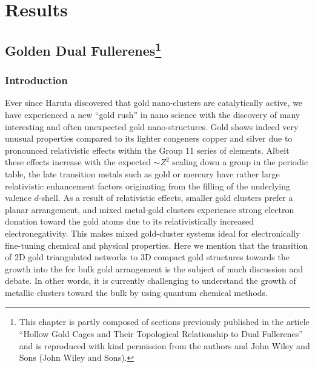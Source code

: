 
\part{Results}
\label{sec:results}

\chapter[Golden Dual Fullerenes]{
    Golden Dual Fullerenes\footnote{This chapter is partly composed of sections
    previously published in the article ``Hollow Gold Cages and Their
    Topological Relationship to Dual
    Fullerenes''\autocite{Trombach_HollowGoldCages_2016a} and is reproduced
    with kind permission from the authors and John Wiley and Sons
    (\textcopyright John Wiley and Sons).}
}
\label{sec:goldendualfullerenes}

\section{\label{sec:intro}Introduction}

Ever since Haruta discovered that gold nano-clusters are catalytically active,\autocite{Haruta1987,Haruta2003,Haruta2007,Haruta2007a}
we have experienced a new ``gold rush'' in nano science\autocite{Schwerdtfeger_Goldgoesnano_2003,Hakkinen2008,Maity2012,Zhang2012a,Gong2012,Miao2012,Kyoungweon-2013}
with the discovery of many interesting and often unexpected gold nano-structures.\autocite{Chen-2015}
Gold shows indeed very unusual properties compared to its lighter congeners copper and silver
due to pronounced relativistic effects within the Group 11 series of elements.\autocite{Pyykko-1988,Schwerdtfeger-2002HA,Pyykko-2004,Pyykko-2007a,Huang-2008,Schwerdtfeger-Lein-2009,pyykko-2012relativistic} Albeit these effects increase 
with the expected $\sim Z^2$ scaling down a group in the periodic table, the late transition metals 
such as gold or mercury have rather large relativistic enhancement factors originating from the filling of the underlying valence $d$-shell.\autocite{Autschbach-2002,Schwerdtfeger-Lein-2009}
As a result of relativistic effects, smaller gold clusters prefer a planar arrangement,\autocite{Bravo-Perez-1999,Hakkinen2000,Landman2002}
and mixed metal-gold clusters experience strong electron donation toward the gold atoms due to its
relativistically increased electronegativity.\autocite{Schwerdtfeger-2002HA} This makes mixed gold-cluster systems ideal 
for electronically fine-tuning chemical and physical properties.\autocite{Schwerdtfeger_Goldgoesnano_2003} Here we mention that the transition of 2D gold
triangulated networks to 3D compact gold structures towards the growth into the fcc bulk gold
arrangement is the subject of much discussion and debate.\autocite{Johansson_2D3Dtransitiongold_2008,Fa-Luong-2008,Assadollahzadeh_systematicsearchminimum_2009,Wang-Pal-2010,Wang-Wang-2011,Wang-Wang-2011,Barnard-2012,Gotz_performancedensityfunctional_2013} In other words, it is currently
challenging to understand the growth of metallic clusters toward the bulk by using quantum chemical methods.\autocite{Zhao-2010,Barnard-2010,Tian-2011}

